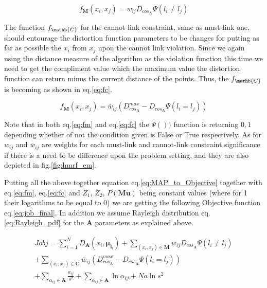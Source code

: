 \documentclass[dvips,dvipdfm,pdftex]{llncs}
\begin{document}
\begin{equation}
	f_{\mathbf{M}}(x_{i},x_{j})=w_{ij}D_{cos_{\mathbf{A}}}\Psi(l_{i}\neq l_{j})
\label{eq:fm}
\end{equation}

The function $f_{\mathb{C}}$ for the cannot-link constraint, same as must-link one, should entourage the distortion function parameters to be changes for putting as far as possible the $x_{i}$ from $x_{j}$ upon the cannot link violation. Since we again using the distance measure of the algorithm as the violation function this time we need to get the compliment value which the maximum value the distortion function can return minus the current distance of the points. Thus, the $f_{\mathb{C}}$ is becoming as shown in eq.\ref{eq:fc}.

\begin{equation}
	f_{\mathbf{M}}(x_{i},x_{j})=\overline{w}_{ij}(D_{cos_{\mathbf{A}}}^{max}-D_{cos_{\mathbf{A}}}\Psi(l_{i}= l_{j}))
\label{eq:fc}
\end{equation}

Note that in both eq.\ref{eq:fm} and eq.\ref{eq:fc} the $\Psi())$ function is returning ${0,1}$ depending whether of not the condition given is False or True respectively. As for $w_{ij}$ and $\overline{w}_{ij}$ are weights for each must-link and cannot-link constraint significance if there is a need to be difference upon the problem setting, and they are also depicted in fig.\ref{fig:hmrf_em}.

Putting all the above together equation eq.\ref{eq:MAP_to_Objective} together with eq.\ref{eq:fm}, eq.\ref{eq:fc} and $Z_{1}$, $Z_{2}$, $P(\mathbf{Mu})$ being constant values (where for 1 their logarithms to be equal to 0) we are getting the following Objective function eq.\ref{eq:job_final}. In addition we assume Rayleigh distribution eq.\ref{eq:Rayleigh_pdf} for the $\mathbf{A}$ parameters as explained above.

\begin{equation}
	\begin{split}
		Jobj=\sum_{i=1}^{N}D_{\mathbf{A}}(x_{i},\mathbf{\mu}_{\mathbf{l}_{i}})
		+\sum_{(x_{i},x_{j})\in\mathbf{M}}w_{ij}D_{cos_{\mathbf{A}}}\Psi(l_{i}\neq l_{j}) \\
		+\sum_{(x_{i},x_{j})\in\mathbf{C}}\overline{w}_{ij}(D_{cos_{\mathbf{A}}}^{max}-D_{cos_{\mathbf{A}}}\Psi(l_{i}=l_{j})) \\
		+\sum_{\alpha_{ij}\in\mathbf{A}}\frac{a_{ij}}{s^{2}}+\sum_{\alpha_{ij}\in\mathbf{A}}\ln\alpha_{ij}+ \mathit{Na} \ln s^{2}
	\end{split}
\label{eq:job_final}
\end{equation}
\end{document}
